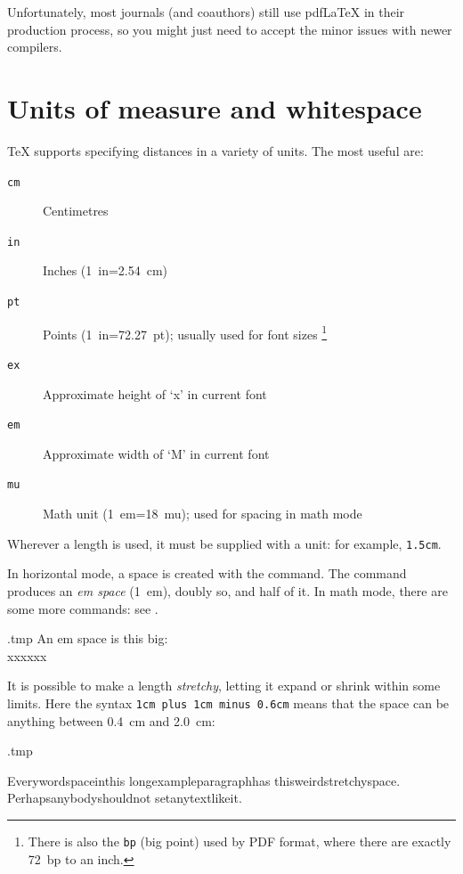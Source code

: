 \begin{practices}
Unfortunately, most journals (and coauthors)
still use pdfLaTeX in their production process,
so you might just need to accept the minor issues with newer compilers.
\end{practices}



%
%
%
\section{Units of measure and whitespace}

\TeX{} supports specifying distances in a variety of units.
The most useful are:
\begin{description}
    \item[\texttt{cm}] Centimetres
    \item[\texttt{in}] Inches (1~in=2.54~cm)
    \item[\texttt{pt}] Points (1~in=72.27~pt); usually used for font sizes%
        \footnote{There is also the \texttt{bp} (big point) used by PDF format,
        where there are exactly 72~bp to an inch.}
    \item[\texttt{ex}] Approximate height of `x' in current font
    \item[\texttt{em}] Approximate width of `M' in current font
    \item[\texttt{mu}] Math unit (1~em=18~mu); used for spacing in math mode
\end{description}
%
Wherever a length is used, it must be supplied with a unit: for example, \verb|1.5cm|.

In horizontal mode, a space is created with the  command.
The  command produces an \emph{em space} (1~em),  doubly so,
and  half of it.
In math mode, there are some more commands: see .
%
\begin{VerbatimOut}{\jobname.tmp}
An em space is this big:\\
xxx\hspace{1em}xxx
\end{VerbatimOut}
\ShowExample


It is possible to make a length \emph{stretchy},
letting it expand or shrink within some limits.
Here the syntax \texttt{1cm plus 1cm minus 0.6cm} means that
the space can be anything between 0.4~cm and 2.0~cm:
%
\begin{VerbatimOut}{\jobname.tmp}
\newcommand\spa
  {\hspace{1cm plus 1cm minus 0.6cm}}

Every\spa word\spa space\spa in\spa this\spa
long\spa example\spa paragraph\spa has\spa
this\spa weird\spa stretchy\spa space.
Perhaps\spa anybody\spa should\spa not\spa
set\spa any\spa text\spa like\spa it.
\end{VerbatimOut}
\ShowExample

